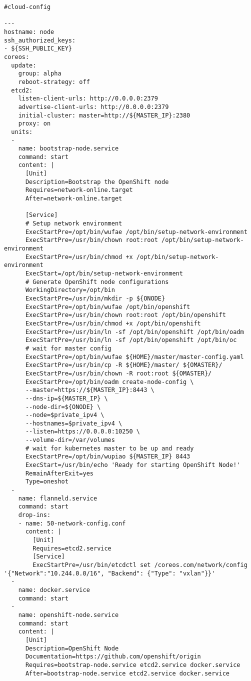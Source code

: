 \begin{verbatim}
#cloud-config

---
hostname: node
ssh_authorized_keys:
- ${SSH_PUBLIC_KEY}
coreos:
  update:
    group: alpha
    reboot-strategy: off
  etcd2:
    listen-client-urls: http://0.0.0.0:2379
    advertise-client-urls: http://0.0.0.0:2379
    initial-cluster: master=http://${MASTER_IP}:2380
    proxy: on
  units:
  -
    name: bootstrap-node.service
    command: start
    content: |
      [Unit]
      Description=Bootstrap the OpenShift node
      Requires=network-online.target
      After=network-online.target

      [Service]
      # Setup network environment
      ExecStartPre=/opt/bin/wufae /opt/bin/setup-network-environment
      ExecStartPre=/usr/bin/chown root:root /opt/bin/setup-network-environment
      ExecStartPre=/usr/bin/chmod +x /opt/bin/setup-network-environment
      ExecStart=/opt/bin/setup-network-environment
      # Generate OpenShift node configurations
      WorkingDirectory=/opt/bin
      ExecStartPre=/usr/bin/mkdir -p ${ONODE}
      ExecStartPre=/opt/bin/wufae /opt/bin/openshift
      ExecStartPre=/usr/bin/chown root:root /opt/bin/openshift
      ExecStartPre=/usr/bin/chmod +x /opt/bin/openshift
      ExecStartPre=/usr/bin/ln -sf /opt/bin/openshift /opt/bin/oadm
      ExecStartPre=/usr/bin/ln -sf /opt/bin/openshift /opt/bin/oc
      # wait for master config
      ExecStartPre=/opt/bin/wufae ${HOME}/master/master-config.yaml
      ExecStartPre=/usr/bin/cp -R ${HOME}/master/ ${OMASTER}/
      ExecStartPre=/usr/bin/chown -R root:root ${OMASTER}/
      ExecStartPre=/opt/bin/oadm create-node-config \
      --master=https://${MASTER_IP}:8443 \
      --dns-ip=${MASTER_IP} \
      --node-dir=${ONODE} \
      --node=$private_ipv4 \
      --hostnames=$private_ipv4 \
      --listen=https://0.0.0.0:10250 \
      --volume-dir=/var/volumes
      # wait for kubernetes master to be up and ready
      ExecStartPre=/opt/bin/wupiao ${MASTER_IP} 8443
      ExecStart=/usr/bin/echo 'Ready for starting OpenShift Node!'
      RemainAfterExit=yes
      Type=oneshot
  -
    name: flanneld.service
    command: start
    drop-ins:
    - name: 50-network-config.conf
      content: |
        [Unit]
        Requires=etcd2.service
        [Service]
        ExecStartPre=/usr/bin/etcdctl set /coreos.com/network/config '{"Network":"10.244.0.0/16", "Backend": {"Type": "vxlan"}}'
  -
    name: docker.service
    command: start
  -
    name: openshift-node.service
    command: start
    content: |
      [Unit]
      Description=OpenShift Node
      Documentation=https://github.com/openshift/origin
      Requires=bootstrap-node.service etcd2.service docker.service
      After=bootstrap-node.service etcd2.service docker.service


\end{verbatim}
